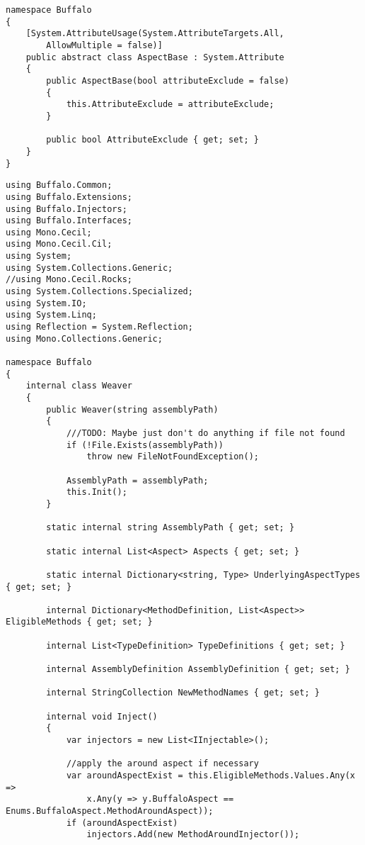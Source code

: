 \begin{lstlisting}[caption={../buffalo/AspectBase.cs}, label=../buffalo/AspectBase.cs, frame=tb, basicstyle=\scriptsize]﻿namespace Buffalo
{
    [System.AttributeUsage(System.AttributeTargets.All,
        AllowMultiple = false)]
    public abstract class AspectBase : System.Attribute
    {
        public AspectBase(bool attributeExclude = false)
        {
            this.AttributeExclude = attributeExclude;
        }

        public bool AttributeExclude { get; set; }
    }
}
\end{lstlisting}

\begin{lstlisting}[caption={../buffalo/Weaver.cs}, label=../buffalo/Weaver.cs, frame=tb, basicstyle=\scriptsize]﻿using Buffalo.Common;
using Buffalo.Extensions;
using Buffalo.Injectors;
using Buffalo.Interfaces;
using Mono.Cecil;
using Mono.Cecil.Cil;
using System;
using System.Collections.Generic;
//using Mono.Cecil.Rocks;
using System.Collections.Specialized;
using System.IO;
using System.Linq;
using Reflection = System.Reflection;
using Mono.Collections.Generic;

namespace Buffalo
{
    internal class Weaver
    {
        public Weaver(string assemblyPath)
        {
            ///TODO: Maybe just don't do anything if file not found
            if (!File.Exists(assemblyPath))
                throw new FileNotFoundException();

            AssemblyPath = assemblyPath;
            this.Init();
        }

        static internal string AssemblyPath { get; set; }

        static internal List<Aspect> Aspects { get; set; }

        static internal Dictionary<string, Type> UnderlyingAspectTypes { get; set; }

        internal Dictionary<MethodDefinition, List<Aspect>> EligibleMethods { get; set; }

        internal List<TypeDefinition> TypeDefinitions { get; set; }

        internal AssemblyDefinition AssemblyDefinition { get; set; }

        internal StringCollection NewMethodNames { get; set; }

        internal void Inject()
        {
            var injectors = new List<IInjectable>();

            //apply the around aspect if necessary
            var aroundAspectExist = this.EligibleMethods.Values.Any(x => 
                x.Any(y => y.BuffaloAspect == Enums.BuffaloAspect.MethodAroundAspect));
            if (aroundAspectExist)
                injectors.Add(new MethodAroundInjector());


\end{lstlisting}
